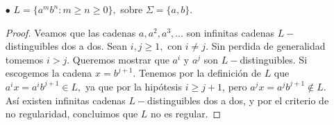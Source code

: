 \begin{itemize}
\begin{proof}
    \end{proof}
    \item[$\bullet$] $L=\{a^mb^n:m\geq n\geq 0\},$ sobre $\Sigma=\{a,b\}.$
    \begin{proof}
        Veamos que las cadenas $a,a^2,a^3,\dots$ son infinitas cadenas $L-$distinguibles dos a dos. Sean $i,j\geq 1,$ con $i\neq j.$ Sin perdida de generalidad tomemos $i>j.$ Queremos mostrar que $a^i$ y $a^j$ son $L-$distinguibles. Si escogemos la cadena $x=b^{j+1}.$ Tenemos por la definición de $L$ que $a^ix=a^ib^{j+1}\in L,$ ya que por la hipótesis $i\geq j+1$, pero $a^jx=a^jb^{j+1}\notin L.$  Así existen infinitas cadenas $L-$distinguibles dos a dos, y por el criterio de no regularidad, concluimos que $L$ no es regular.
    \end{proof}

\end{itemize}